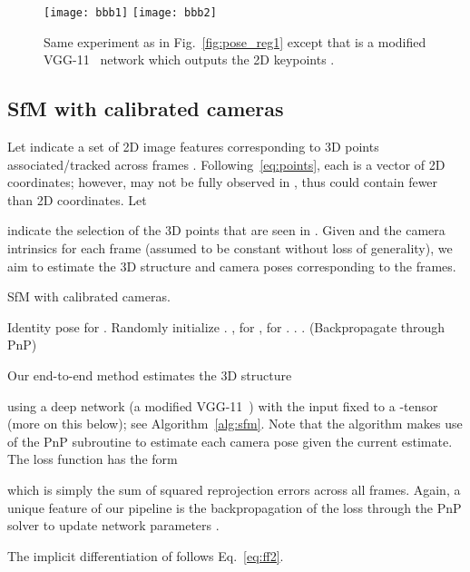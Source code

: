 \documentclass[10pt,twocolumn,letterpaper]{article}
\begin{document}
\begin{figure}[t]\centering
    \centering
    \texttt{[image: bbb1]}
    \texttt{[image: bbb2]}
    \caption{Same experiment as in Fig.~\ref{fig:pose_reg1} except that  is a modified VGG-11~\cite{Simonyan2015very} network which outputs the 2D keypoints .}
    \label{fig:pose_reg2}
\end{figure}


\subsection{SfM with calibrated cameras}\label{sec:sfm}

Let  indicate a set of 2D image features corresponding to  3D points  associated/tracked across  frames . Following~\eqref{eq:points}, each  is a vector of 2D coordinates; however,  may not be fully observed in , thus  could contain fewer than  2D coordinates. Let

indicate the selection of the 3D points  that are seen in . Given  and the camera intrinsics for each frame (assumed to be constant  without loss of generality), we aim to estimate the 3D structure  and camera poses  corresponding to the  frames.

\begin{algorithm}[t]
\caption{SfM with calibrated cameras.}
\label{alg:sfm}
\begin{algorithmic}[1]
\STATE  Identity pose for .
\STATE Randomly initialize 
\STATE .
\STATE , for 
\STATE , for .
\STATE .
\STATE . \quad (Backpropagate through PnP) 
\ENDWHILE
\end{algorithmic}
\end{algorithm}

Our end-to-end method estimates the 3D structure

using a deep network  (a modified VGG-11~\cite{Simonyan2015very}) with the input fixed to a -tensor (more on this below); see Algorithm~\ref{alg:sfm}. Note that the algorithm makes use of the PnP subroutine to estimate each camera pose given the current  estimate. The loss function  has the form

which is simply the sum of squared reprojection errors across all frames. Again, a unique feature of our pipeline is the backpropagation of the loss through the PnP solver to update network parameters .

The implicit differentiation of  follows Eq.~\eqref{eq:ff2}.
\end{document}
